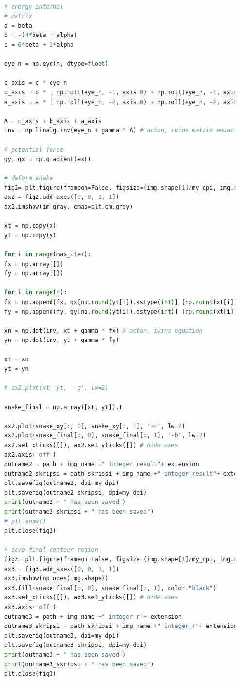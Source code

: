 \begin{lstlisting}[language=Python, basicstyle=\tiny]
	
	# energy internal
	# matrix
	a = beta
	b = -(4*beta + alpha)
	c = 6*beta + 2*alpha
	
	eye_n = np.eye(n, dtype=float)
	
	c_axis = c * eye_n
	b_axis = b * ( np.roll(eye_n, -1, axis=0) + np.roll(eye_n, -1, axis=1) )
	a_axis = a * ( np.roll(eye_n, -2, axis=0) + np.roll(eye_n, -2, axis=1) )
	
	A = c_axis + b_axis + a_axis
	inv = np.linalg.inv(eye_n + gamma * A) # acton, ivins matrix equation
	
	# potential force
	gy, gx = np.gradient(ext)
	
	# deform snake
	fig2= plt.figure(frameon=False, figsize=(img.shape[1]/my_dpi, img.shape[0]/my_dpi), dpi=my_dpi)
	ax2 = fig2.add_axes([0, 0, 1, 1])
	ax2.imshow(im_gray, cmap=plt.cm.gray)
	
	xt = np.copy(x)
	yt = np.copy(y)
	
	for i in range(max_iter):
	fx = np.array([])
	fy = np.array([])
	
	for i in range(n):
	fx = np.append(fx, gx[np.round(yt[i]).astype(int)] [np.round(xt[i]).astype(int)] )
	fy = np.append(fy, gy[np.round(yt[i]).astype(int)] [np.round(xt[i]).astype(int)] )
	
	xn = np.dot(inv, xt + gamma * fx) # acton, ivins equation
	yn = np.dot(inv, yt + gamma * fy)
	
	xt = xn
	yt = yn
	
	# ax2.plot(xt, yt, '-g', lw=2)
	
	snake_final = np.array([xt, yt]).T
	
	ax2.plot(snake_xy[:, 0], snake_xy[:, 1], '-r', lw=2)
	ax2.plot(snake_final[:, 0], snake_final[:, 1], '-b', lw=2)
	ax2.set_xticks([]), ax2.set_yticks([]) # hide axes
	ax2.axis('off')
	outname2 = path + img_name +"_integer_result"+ extension
	outname2_skripsi = path_skripsi + img_name +"_integer_result"+ extension
	plt.savefig(outname2, dpi=my_dpi)
	plt.savefig(outname2_skripsi, dpi=my_dpi)
	print(outname2 + " has been saved")
	print(outname2_skripsi + " has been saved")
	# plt.show()
	plt.close(fig2)
	
	# save final contour region
	fig3= plt.figure(frameon=False, figsize=(img.shape[1]/my_dpi, img.shape[0]/my_dpi), dpi=my_dpi)
	ax3 = fig3.add_axes([0, 0, 1, 1])
	ax3.imshow(np.ones(img.shape))
	ax3.fill(snake_final[:, 0], snake_final[:, 1], color="black")
	ax3.set_xticks([]), ax3.set_yticks([]) # hide axes
	ax3.axis('off')
	outname3 = path + img_name +"_integer_r"+ extension
	outname3_skripsi = path_skripsi + img_name +"_integer_r"+ extension
	plt.savefig(outname3, dpi=my_dpi)
	plt.savefig(outname3_skripsi, dpi=my_dpi)
	print(outname3 + " has been saved")
	print(outname3_skripsi + " has been saved")
	plt.close(fig3)
	

\end{lstlisting}
